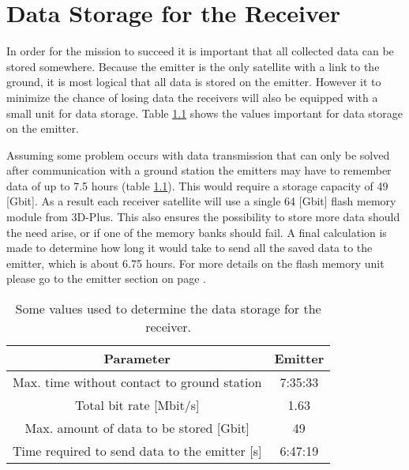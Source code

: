 \documentclass[11pt]{report}
\begin{document}
\chapter{Data Storage for the Receiver}
\label{DSReceiver}

In order for the mission to succeed it is important that all collected data can be stored somewhere. Because the emitter is the only satellite with a link to the ground, it is most logical that all data is stored on the emitter. However it to minimize the chance of losing data the receivers will also be equipped with a small unit for data storage. Table \ref{DSReceiverTable} shows the values important for data storage on the emitter. 

Assuming some problem occurs with data transmission that can only be solved after communication with a ground station the emitters may have to remember data of up to 7.5 hours (table \ref{DSReceiverTable}). This would require a storage capacity of 49 [Gbit]. As a result each receiver satellite will use a single 64 [Gbit] flash memory module from 3D-Plus. This also ensures the possibility to store more data should the need arise, or if one of the memory banks should fail. A final calculation is made to determine how long it would take to send all the saved data to the emitter, which is about 6.75 hours. For more details on the flash memory unit please go to the emitter section on page \pageref{DSEmitter}.

\begin{table}
\centering
\begin{tabular}{c|c}
\textbf{Parameter}  & \textbf{Emitter} \\\hline\hline
	Max. time without contact to ground station & 7:35:33 \\
	Total bit rate [Mbit/s] & 1.63 \\
	Max. amount of data to be stored [Gbit] & 49 \\
	Time required to send data to the emitter [s] & 6:47:19 \\
\end{tabular}
\caption{Some values used to determine the data storage for the receiver.}
\label{DSReceiverTable}
\end{table}
\end{document}
